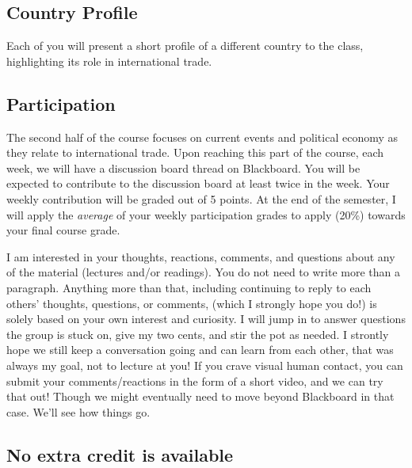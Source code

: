 \documentclass{article}
\begin{document}
\hypertarget{country-profile}{%
\subsection*{Country Profile}\label{country-profile}}

Each of you will present a short profile of a different country to the
class, highlighting its role in international trade.

\hypertarget{participation}{%
\subsection*{Participation}\label{participation}}

The second half of the course focuses on current events and political
economy as they relate to international trade. Upon reaching this part
of the course, each week, we will have a discussion board thread on
Blackboard. You will be expected to contribute to the discussion board
at least twice in the week. Your weekly contribution will be graded out
of 5 points. At the end of the semester, I will apply the \emph{average}
of your weekly participation grades to apply (20\%) towards your final
course grade.

I am interested in your thoughts, reactions, comments, and questions
about any of the material (lectures and/or readings). You do not need to
write more than a paragraph. Anything more than that, including
continuing to reply to each others' thoughts, questions, or comments,
(which I strongly hope you do!) is solely based on your own interest and
curiosity. I will jump in to answer questions the group is stuck on,
give my two cents, and stir the pot as needed. I strontly hope we still
keep a conversation going and can learn from each other, that was always
my goal, not to lecture at you! If you crave visual human contact, you
can submit your comments/reactions in the form of a short video, and we
can try that out! Though we might eventually need to move beyond
Blackboard in that case. We'll see how things go.

\hypertarget{no-extra-credit-is-available}{%
\subsection*{No extra credit is
available}\label{no-extra-credit-is-available}}
\end{document}
